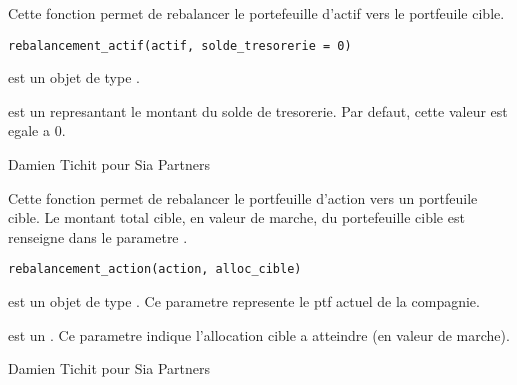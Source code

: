 \documentclass[a4paper]{book}
\begin{document}
%
\begin{Description}\relax
Cette fonction permet de rebalancer le portefeuille d'actif vers le portfeuile cible.
\end{Description}
%
\begin{Usage}
\begin{verbatim}
rebalancement_actif(actif, solde_tresorerie = 0)
\end{verbatim}
\end{Usage}
%
\begin{Arguments}
\begin{ldescription}
\item[\code{actif}] est un objet de type .

\item[\code{solde\_tresorerie}] est un  represantant le montant du solde de tresorerie. Par defaut, cette valeur est egale a 0.
\end{ldescription}
\end{Arguments}
%
\begin{Author}\relax
Damien Tichit pour Sia Partners
\end{Author}
%
\begin{Description}\relax
Cette fonction permet de rebalancer le portfeuille d'action vers un portfeuile cible.
Le montant total cible, en valeur de marche, du portefeuille cible est renseigne dans le parametre .
\end{Description}
%
\begin{Usage}
\begin{verbatim}
rebalancement_action(action, alloc_cible)
\end{verbatim}
\end{Usage}
%
\begin{Arguments}
\begin{ldescription}
\item[\code{action}] est un objet de type . Ce parametre represente le ptf actuel de la compagnie.

\item[\code{alloc\_cible}] est un . Ce parametre indique l'allocation cible a atteindre (en valeur de marche).
\end{ldescription}
\end{Arguments}
%
\begin{Author}\relax
Damien Tichit pour Sia Partners
\end{Author}
\end{document}
